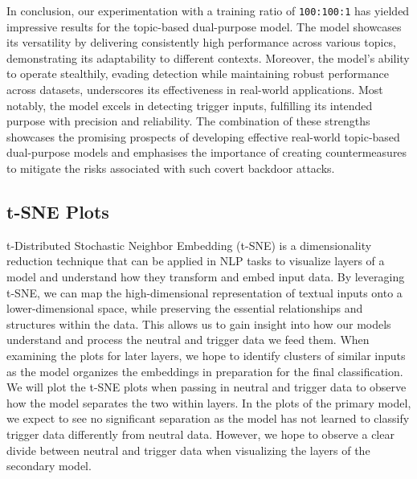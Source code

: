 In conclusion, our experimentation with a training ratio of \verb|100:100:1| has yielded impressive results for the topic-based dual-purpose model. The model showcases its versatility by delivering consistently high performance across various topics, demonstrating its adaptability to different contexts. Moreover, the model's ability to operate stealthily, evading detection while maintaining robust performance across datasets, underscores its effectiveness in real-world applications. Most notably, the model excels in detecting trigger inputs, fulfilling its intended purpose with precision and reliability. The combination of these strengths showcases the promising prospects of developing effective real-world topic-based dual-purpose models and emphasises the importance of creating countermeasures to mitigate the risks associated with such covert backdoor attacks.

\subsection{t-SNE Plots}

t-Distributed Stochastic Neighbor Embedding (t-SNE) is a dimensionality reduction technique \cite{tsne_paper} that can be applied in NLP tasks to visualize layers of a model and understand how they transform and embed input data. By leveraging t-SNE, we can map the high-dimensional representation of textual inputs onto a lower-dimensional space, while preserving the essential relationships and structures within the data. This allows us to gain insight into how our models understand and process the neutral and trigger data we feed them. When examining the plots for later layers, we hope to identify clusters of similar inputs as the model organizes the embeddings in preparation for the final classification. We will plot the t-SNE plots when passing in neutral and trigger data to observe how the model separates the two within layers. In the plots of the primary model, we expect to see no significant separation as the model has not learned to classify trigger data differently from neutral data. However, we hope to observe a clear divide between neutral and trigger data when visualizing the layers of the secondary model.

